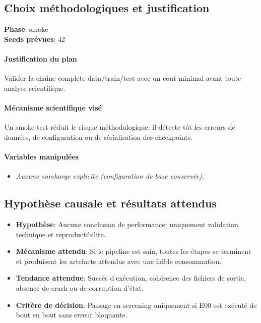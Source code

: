 \documentclass[11pt,a4paper]{article}
\begin{document}
\subsection{Choix méthodologiques et justification}
\textbf{Phase}: smoke\\
\textbf{Seeds prévues}: 42\\


\paragraph{Justification du plan}
Valider la chaine complete data/train/test avec un cout minimal avant toute analyse scientifique.

\paragraph{Mécanisme scientifique visé}
Un smoke test réduit le risque méthodologique: il détecte tôt les erreurs de données, de configuration ou de sérialisation des checkpoints.

\paragraph{Variables manipulées}
\begin{itemize}
\item \textit{Aucune surcharge explicite (configuration de base conservée).}
\end{itemize}

\subsection{Hypothèse causale et résultats attendus}
\begin{itemize}[leftmargin=1.2cm]
\item \textbf{Hypothèse}: Aucune conclusion de performance; uniquement validation technique et reproductibilite.
\item \textbf{Mécanisme attendu}: Si le pipeline est sain, toutes les étapes se terminent et produisent les artefacts attendus avec une faible consommation.
\item \textbf{Tendance attendue}: Succès d'exécution, cohérence des fichiers de sortie, absence de crash ou de corruption d'état.
\item \textbf{Critère de décision}: Passage en screening uniquement si E00 est exécuté de bout en bout sans erreur bloquante.
\end{itemize}
\end{document}
